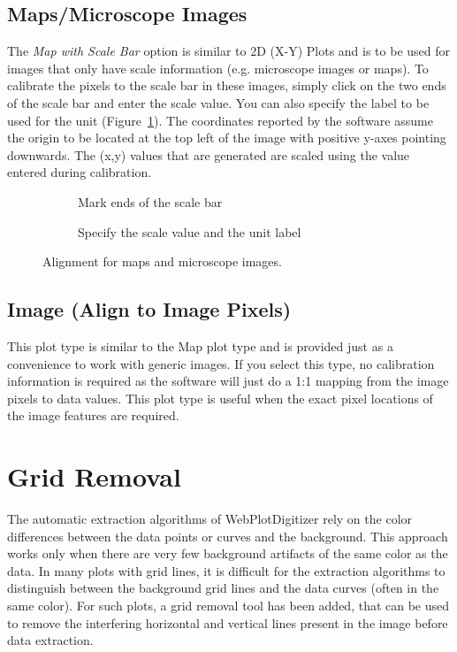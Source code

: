 \documentclass[letterpaper, 11pt]{article}
\begin{document}
\subsection{Maps/Microscope Images}
The \emph{Map with Scale Bar} option is similar to 2D (X-Y) Plots and is to be used for images that only have scale information (e.g. microscope images or maps). To calibrate the pixels to the scale bar in these images, simply click on the two ends of the scale bar and enter the scale value. You can also specify the label to be used for the unit (Figure~\ref{fig:mapAlignment}). The coordinates reported by the software assume the origin to be located at the top left of the image with positive y-axes pointing downwards. The (x,y) values that are generated are scaled using the value entered during calibration.

\begin{figure}
\centering
{\begin{subfigure}[b]{0.4\textwidth}
\caption{Mark ends of the scale bar}
\end{subfigure}
\hspace{5mm}
\begin{subfigure}[b]{0.3\textwidth}
\caption{Specify the scale value and the unit label}
\end{subfigure}}
\caption{Alignment for maps and microscope images.}
\label{fig:mapAlignment}
\end{figure}

\subsection{Image (Align to Image Pixels)}
This plot type is similar to the Map plot type and is provided just as a convenience to work with generic images. If you select this type, no calibration information is required as the software will just do a 1:1 mapping from the image pixels to data values. This plot type is useful when the exact pixel locations of the image features are required.

\section{Grid Removal}
The automatic extraction algorithms of WebPlotDigitizer rely on the color differences between the data points or curves and the background. This approach works only when there are very few background artifacts of the same color as the data. In many plots with grid lines, it is difficult for the extraction algorithms to distinguish between the background grid lines and the data curves (often in the same color). For such plots, a grid removal tool has been added, that can be used to remove the interfering horizontal and vertical lines present in the image before data extraction.
\end{document}
